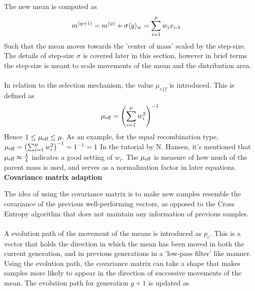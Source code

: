The new mean is computed as
\begin{align}
m^{(g+1)} &= m^{(g)} + \sigma \langle y \rangle_{w} = \sum^{\mu}_{i = 1} w_{i}x_{i:\lambda} \label{eq:movemean}
\end{align}
Such that the mean moves towards the 'center of mass' scaled by the step-size.
The details of step-size $\sigma$ is covered later in this section,
however in brief terms the step-size is meant to scale movements 
of the mean and the distribution area.\\
\\
In relation to the selection mechanism, the value $\mu_{eff}$ is introduced.
This is defined as
\begin{align}
\mu_{\text{eff}} = \left( \sum_{i=1}^{\mu} w_i^2 \right)^{-1}
\end{align}
Hence $1 \leq \mu_{\text{eff}} \leq \mu$. As an example, for the equal recombination
type, $\mu_{\text{eff}} = \left( \sum_{i=1}^{\mu} w_i^2 \right)^{-1} = 1^{-1} =1$
In the tutorial by N. Hansen, it's mentioned that $\mu_{\text{eff}} \approx 
\frac{\lambda}{4}$ indicates a good setting of $w_i$. The $\mu_{\text{eff}}$ is 
measure of how much of the parent mass is used, and serves as a normalization 
factor in later equations.\\

\textbf{Covariance matrix adaption}

The idea of using the covariance matrix is to make new samples
resemble the covariance of the previous well-performing vectors, as opposed 
to the Cross Entropy algorithm that does not maintain any information of
previous samples.\\
\\
A evolution path of the movement of the means is introduced as $p_{c}$. This 
is a vector that holds the direction in which the mean has been moved in 
both the current generation, and in previous generations in 
a 'low-pass filter' like manner. Using the 
evolution path, the covariance matrix can take a shape that 
makes samples more likely to appear in the direction of successive 
movements of the mean.
The evolution path for generation $g+1$ is updated as



